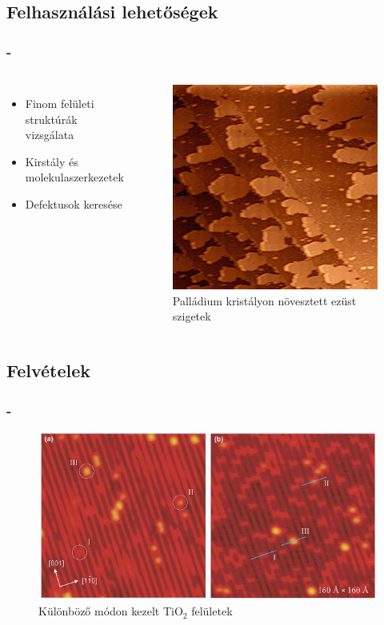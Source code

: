 \documentclass[aspectratio=169]{beamer}
\newcommand{\framet}{\frametitle{\secname{} - \subsecname}}
\begin{document}
\subsection{Felhasználási lehetőségek}
\begin{frame}
\framet

\begin{columns}
\begin{itemize}
\item Finom felületi struktúrák vizsgálata
\item Kirstály és molekulaszerkezetek
\item Defektusok keresése
\end{itemize}
\begin{figure}
\includegraphics[width=.75\textwidth]{stm_silver.png}
\caption{Palládium kristályon növesztett ezüst szigetek}
\end{figure}
\end{columns}
\end{frame}

\subsection{Felvételek}
\begin{frame}
\framet
\begin{figure}
\includegraphics[width=.7\textwidth]{stm_end1.png}
\caption{Különböző módon kezelt TiO$_2$ felületek}
\end{figure}
\end{frame}
\end{document}
